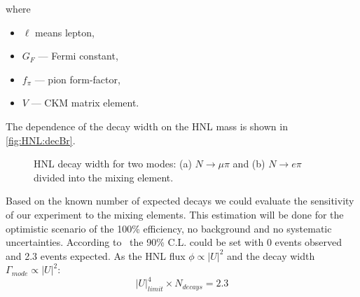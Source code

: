 \documentclass[../main.tex]{subfiles}
\begin{document}
where
\begin{itemize}
    \item $\ell$ means lepton,
    \item $G_F$ --- Fermi constant,
    \item $f_\pi$ --- pion form-factor,
    \item $V$ --- CKM matrix element.
\end{itemize}

The dependence of the decay width on the HNL mass is shown in \autoref{fig:HNL:decBr}.

\begin{figure}[!ht]
    \begin{minipage}[!ht]{0.49\linewidth}
    \end{minipage}
    \hfill
    \begin{minipage}[!ht]{0.49\linewidth}
    \end{minipage}
    \caption{HNL decay width for two modes: (a) $N\to \mu\pi$ and (b) $N\to e\pi$ divided into the mixing element.}
    \label{fig:HNL:decBr}
\end{figure}

Based on the known number of expected decays we could evaluate the sensitivity of our experiment to the mixing elements. This estimation will be done for the optimistic scenario of the 100\% efficiency, no background and no systematic uncertainties. According to~\cite{Cousins1992} the 90\% C.L. could be set with 0 events observed and 2.3 events expected. As the HNL flux $\phi\propto\left|U\right|^2$ and the decay width $\Gamma_{mode}\propto\left|U\right|^2$:
\begin{equation}
    \left|U\right|^4_{limit} \times N_{decays} = 2.3
\end{equation}
\end{document}
